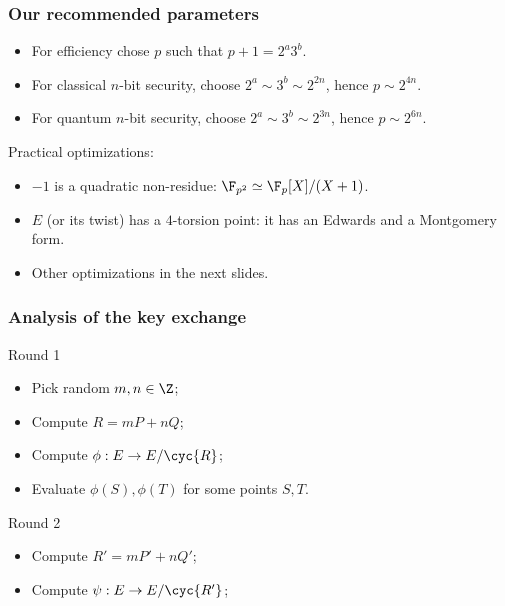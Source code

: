 \documentclass{beamer}
\begin{document}
\begin{frame}
  \frametitle{Our recommended parameters}
  
  \begin{itemize}
  \item For efficiency chose $p$ such that \alert{$p+1 = 2^a3^b$}.
  \item For classical $n$-bit security, choose \alert{$2^a\sim3^b\sim2^{2n}$}, hence \alert{$p\sim2^{4n}$}.
  \item For quantum $n$-bit security, choose \alert{$2^a\sim3^b\sim2^{3n}$}, hence \alert{$p\sim2^{6n}$}.
  \end{itemize}

  \begin{block}{Practical optimizations:}
    \begin{itemize}
    \item $-1$ is a quadratic non-residue: \alert{$\F_{p^2}\simeq\F_p[X]/(X+1)$}.
    \item $E$ (or its twist) has a $4$-torsion point: it has an
      \alert{Edwards} and a \alert{Montgomery} form.
    \item Other optimizations in the next slides.
    \end{itemize}
  \end{block}

\end{frame}


\begin{frame}
  \frametitle{Analysis of the key exchange}
  
  \begin{block}{Round 1}
    \begin{itemize}
    \item Pick random \alert{$m,n\in\Z$};
    \item Compute \alert{$R = mP + nQ$};
    \item Compute \alert{$\phi : E \to E/\cyc{R}$};
    \item Evaluate \alert{$\phi(S), \phi(T)$} for some points $S,T$.
    \end{itemize}
  \end{block}
  
  \begin{block}{Round 2}
    \begin{itemize}
    \item Compute \alert{$R' = mP' + nQ'$};
    \item Compute \alert{$\psi : E \to E/\cyc{R'}$};
    \end{itemize}
  \end{block}
\end{frame}
\end{document}
